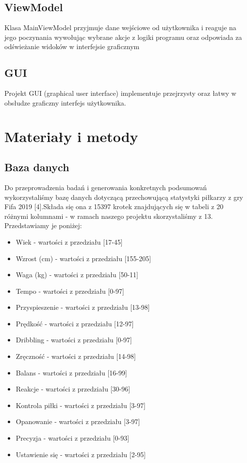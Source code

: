 \documentclass{classrep}
\begin{document}
\subsection{ViewModel}

Klasa MainViewModel przyjmuje dane wejściowe od użytkownika i reaguje na jego poczynania wywołując wybrane akcje z logiki programu oraz odpowiada za odświeżanie widoków w interfejsie graﬁcznym

\subsection{GUI}

Projekt GUI (graphical user interface) implementuje przejrzysty oraz łatwy w obsłudze graﬁczny interfejs użytkownika.

\section{Materiały i metody}

\subsection{Baza danych}
Do przeprowadzenia badań i generowania konkretnych podsumowań wykorzystaliśmy bazę danych dotyczącą przechowującą statystyki piłkarzy z gry Fifa 2019 [4].Składa się ona z 15397 krotek znajdujących się w tabeli z 20 różnymi kolumnami - w ramach naszego projektu skorzystaliśmy z 13. Przedstawiamy je poniżej:

\begin{itemize}
	\item Wiek - wartości z przedziału [17-45]
	\item Wzrost (cm) - wartości z przedziału [155-205]
	\item Waga (kg) - wartości z przedziału [50-11] 
	\item Tempo - wartości z przedziału [0-97]
	\item Przyspieszenie - wartości z przedziału [13-98]
	\item Prędkość - wartości z przedziału [12-97]
	\item Dribbling - wartości z przedziału [0-97]
	\item Zręczność - wartości z przedziału [14-98]
	\item Balans - wartości z przedziału [16-99]
	\item Reakcje - wartości z przedziału [30-96]
	\item Kontrola piłki - wartości z przedziału [3-97]
	\item Opanowanie - wartości z przedziału [3-97]
	\item Precyzja - wartości z przedziału [0-93]
	\item Ustawienie się - wartości z przedziału [2-95]
\end{itemize}
\end{document}
